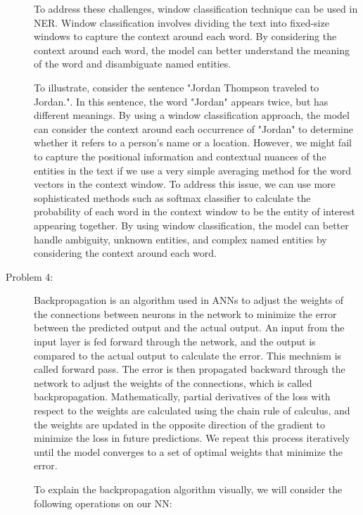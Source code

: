 \documentclass[12pt]{article}
\begin{document}
\begin{description}
  To address these challenges, window classification technique can be used in NER. Window classification involves dividing the text into fixed-size windows
  to capture the context around each word. By considering the context around each word, the model can better understand the meaning of the word and disambiguate named entities.

  To illustrate, consider the sentence "Jordan Thompson traveled to Jordan.". In this sentence, the word "Jordan" appears twice, but has different meanings.
  By using a window classification approach, the model can consider the context around each occurrence of "Jordan" to determine whether it refers to a person's name or a location.
  However, we might fail to capture the positional information and contextual nuances of the entities in the text if we use a very simple averaging method for the word vectors in the context window.
  To address this issue, we can use more sophisticated methods such as softmax classifier to calculate the probability of each word in the context window to be the entity of interest appearing together.
  By using window classification, the model can better handle ambiguity, unknown entities, and complex named entities by considering the context around each word.

  \pagebreak

  \item[Problem 4:] \hfill %
  
  Backpropagation is an algorithm used in ANNs to adjust the weights of the connections between neurons in the network to minimize the error between the predicted output 
  and the actual output.
  An input from the input layer is fed forward through the network, and the output is compared to the actual output to calculate the error. This mechnism is called forward pass.
  The error is then propagated backward through the network to adjust the weights of the connections, which is called backpropagation. Mathematically, partial derivatives of the loss
  with respect to the weights are calculated using the chain rule of calculus, and the weights are updated in the opposite direction of the gradient to minimize the loss in future predictions.
  We repeat this process iteratively until the model converges to a set of optimal weights that minimize the error.

  To explain the backpropagation algorithm visually, we will consider the following operations on our NN:


\end{description}
\end{document}

